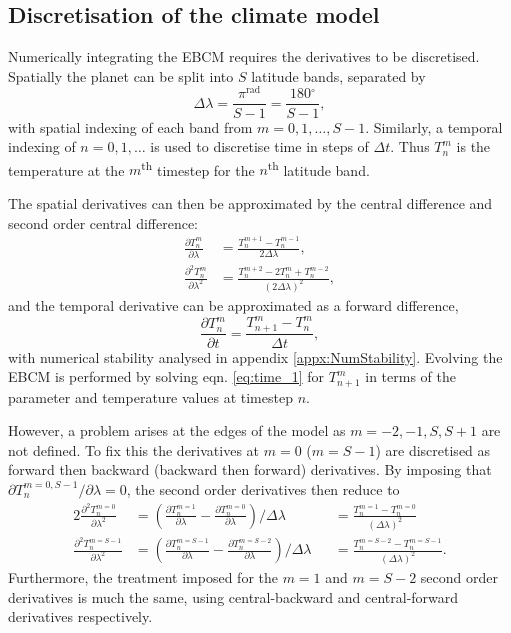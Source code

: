 \documentclass[12pt, onecolumn]{revtex4-2}    %
\newcommand{\radians}{\ensuremath{^{\text{rad}}}}
\newcommand{\degrees}{\ensuremath{^{\circ}}}
\newcommand{\partialderiv}[2]{\frac{\partial {#1}}{\partial {#2}}}
\newcommand{\partialderivsecnd}[2]{\frac{\partial^2 {#1}}{\partial {#2}^2}}
\begin{document}
\subsection{Discretisation of the climate model} \label{ssec:DiscretisationPDE}
Numerically integrating the EBCM requires the derivatives to be discretised.
Spatially the planet can be split into $S$ latitude bands, separated by
\begin{equation}
  \Delta\lambda = \frac{\pi\radians}{S-1} = \frac{180\degrees}{S-1},
\end{equation}
with spatial indexing of each band from $m=0, 1, \dots, S-1$.
Similarly, a temporal indexing of $n=0, 1, \dots$ is used to discretise time in steps of $\Delta t$.
Thus $T^m_n$ is the temperature at the $m$\textsuperscript{th} timestep for the $n$\textsuperscript{th} latitude band.

The spatial derivatives can then be approximated by the central difference and second order central difference:
\begin{align}
  \partialderiv{T^m_n}{\lambda}      & = \frac{T^{m+1}_n - T^{m-1}_n}{2 \Delta\lambda},     \label{eq:space_1}        \\
  \partialderivsecnd{T^m_n}{\lambda} & = \frac{T^{m+2}_n -2T^m_n + T^{m-2}_n}{(2 \Delta\lambda)^2},\label{eq:space_2}
\end{align}
and the temporal derivative can be approximated as a forward difference,
\begin{equation}
  \partialderiv{T^m_n}{t} = \frac{T^m_{n+1} - T^m_n}{\Delta t},\label{eq:time_1}
\end{equation}
with numerical stability analysed in appendix \ref{appx:NumStability}.
Evolving the EBCM is performed by solving eqn. \eqref{eq:time_1} for $T^m_{n+1}$ in terms of the parameter and temperature values at timestep $n$.

However, a problem arises at the edges of the model as $m=-2, -1, S, S+1$ are not defined.
To fix this the derivatives at $m=0$ ($m=S-1$) are discretised as forward then backward (backward then forward) derivatives.
By imposing that ${\partial T^{m=0, S-1}_n}/{\partial \lambda} = 0$, the second order derivatives then reduce to
\begin{alignat}{2}
  \partialderivsecnd{T^{m=0}_n}{\lambda}   & = \left(\partialderiv{T^{m=1}_n}{\lambda} - \partialderiv{T^{m=0}_n}{\lambda}\right) / \Delta\lambda     &  & = \frac{T^{m=1}_n - T^{m=0}_n}{(\Delta\lambda)^2}
  \label{eq:forward_backward}                                                                                                                                                                                     \\
  \partialderivsecnd{T^{m=S-1}_n}{\lambda} & = \left(\partialderiv{T^{m=S-1}_n}{\lambda} - \partialderiv{T^{m=S-2}_n}{\lambda}\right) / \Delta\lambda &  & = \frac{T^{m=S-2}_n - T^{m=S-1}_n}{(\Delta\lambda)^2}.
  \label{eq:backward_forward}
\end{alignat}
Furthermore, the treatment imposed for the $m=1$ and $m=S-2$ second order derivatives is much the same, using central-backward and central-forward derivatives respectively.
\end{document}
